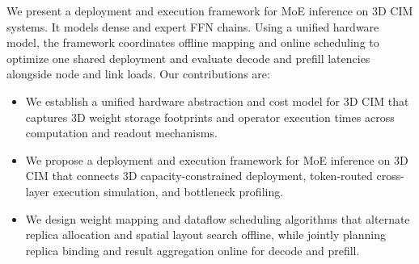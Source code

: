 We present a deployment and execution framework for MoE inference on 3D CIM systems. It models dense and expert FFN chains. Using a unified hardware model, the framework coordinates offline mapping and online scheduling to optimize one shared deployment and evaluate decode and prefill latencies alongside node and link loads. Our contributions are:
\begin{itemize}
  \item We establish a unified hardware abstraction and cost model for 3D CIM that captures 3D weight storage footprints and operator execution times across computation and readout mechanisms.
  \item We propose a deployment and execution framework for MoE inference on 3D CIM that connects 3D capacity-constrained deployment, token-routed cross-layer execution simulation, and bottleneck profiling.
  \item We design weight mapping and dataflow scheduling algorithms that alternate replica allocation and spatial layout search offline, while jointly planning replica binding and result aggregation online for decode and prefill.
\end{itemize}
